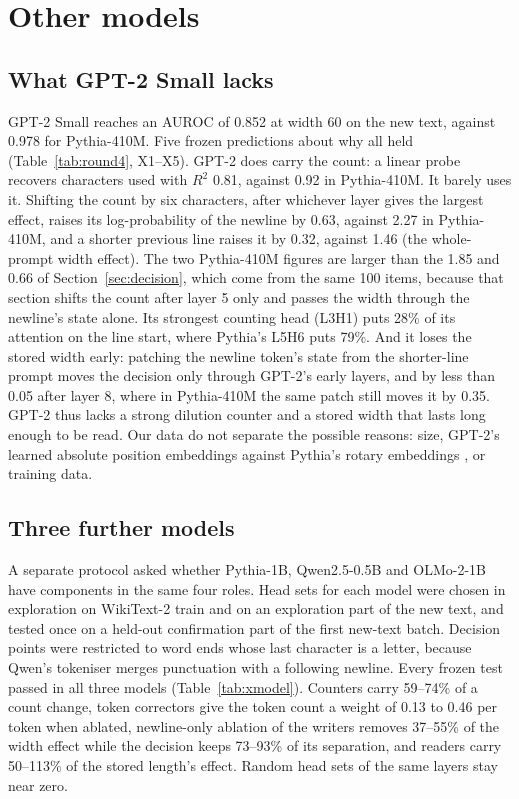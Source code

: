 \documentclass[11pt,a4paper]{article}
\begin{document}
\FloatBarrier
\section{Other models}
\label{sec:models}

\subsection{What GPT-2 Small lacks}

GPT-2 Small reaches an AUROC of 0.852 at width 60 on the new text, against 0.978 for Pythia-410M. Five frozen predictions about why all held (Table~\ref{tab:round4}, X1--X5). GPT-2 does carry the count: a linear probe recovers characters used with $R^2$ 0.81, against 0.92 in Pythia-410M. It barely uses it. Shifting the count by six characters, after whichever layer gives the largest effect, raises its log-probability of the newline by 0.63, against 2.27 in Pythia-410M, and a shorter previous line raises it by 0.32, against 1.46 (the whole-prompt width effect). The two Pythia-410M figures are larger than the 1.85 and 0.66 of Section~\ref{sec:decision}, which come from the same 100 items, because that section shifts the count after layer 5 only and passes the width through the newline's state alone. Its strongest counting head (L3H1) puts 28\% of its attention on the line start, where Pythia's L5H6 puts 79\%. And it loses the stored width early: patching the newline token's state from the shorter-line prompt moves the decision only through GPT-2's early layers, and by less than 0.05 after layer 8, where in Pythia-410M the same patch still moves it by 0.35. GPT-2 thus lacks a strong dilution counter and a stored width that lasts long enough to be read. Our data do not separate the possible reasons: size, GPT-2's learned absolute position embeddings against Pythia's rotary embeddings \citep{su2024roformer}, or training data.

\subsection{Three further models}
\label{sec:xmodel}

A separate protocol asked whether Pythia-1B, Qwen2.5-0.5B and OLMo-2-1B have components in the same four roles. Head sets for each model were chosen in exploration on WikiText-2 train and on an exploration part of the new text, and tested once on a held-out confirmation part of the first new-text batch. Decision points were restricted to word ends whose last character is a letter, because Qwen's tokeniser merges punctuation with a following newline. Every frozen test passed in all three models (Table~\ref{tab:xmodel}). Counters carry 59--74\% of a count change, token correctors give the token count a weight of 0.13 to 0.46 per token when ablated, newline-only ablation of the writers removes 37--55\% of the width effect while the decision keeps 73--93\% of its separation, and readers carry 50--113\% of the stored length's effect. Random head sets of the same layers stay near zero.
\end{document}
